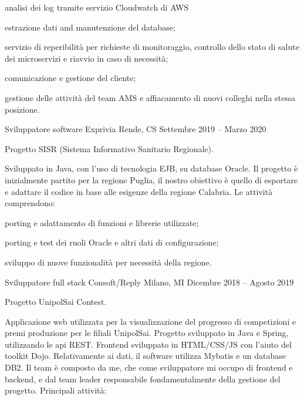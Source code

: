 \documentclass[]{style}
\begin{document}
\begin{cventries}
{\begin{cventryparagraph}
{\begin{cventryparagraphlist}
    		\item {analisi dei log tramite servizio Cloudwatch di AWS}
    		\item {estrazione dati and manutenzione del database;}
    		\item {servizio di reperibilità per richieste di monitoraggio, controllo dello stato di salute dei microservizi e riavvio in caso di necessità;}
    		\item {comunicazione e gestione del cliente;}
    		\item {gestione delle attività del team AMS e affiacamento di nuovi colleghi nella stessa posizione.}
    	\end{cventryparagraphlist}}
	\end{cventryparagraph}}
	\cventry
	{Sviluppatore software}
	{Exprivia}
	{Rende, CS}
	{Settembre 2019 – Marzo 2020}
	{\begin{cventryparagraph}
		\item {Progetto SISR (Sistema Informativo Sanitario Regionale).}
		\item {Sviluppato in Java, con l'uso di tecnologia EJB, su database Oracle. Il progetto è inizialmente partito per la regione Puglia, il nostro obiettivo è quello di esportare e adattare il codice in base alle esigenze della regione Calabria. Le attività comprendono:}
    	{\begin{cventryparagraphlist}
    		\item {porting e adattamento di funzioni e librerie utilizzate;}
    		\item {porting e test dei ruoli Oracle e altri dati di configurazione;}
    		\item {sviluppo di nuove funzionalità per necessità della regione.}
    	\end{cventryparagraphlist}}
	\end{cventryparagraph}}
	\cventry
	{Sviluppatore full stack}
	{Consoft/Reply}
	{Milano, MI}
	{Dicembre 2018 – Agosto 2019}
	{\begin{cventryparagraph}
		\item {Progetto UnipolSai Contest.}
		\item {Applicazione web utilizzata per la visualizzazione del progresso di competizioni e premi produzione per le filiali UnipolSai. Progetto sviluppato in Java e Spring, utilizzando le api REST. Frontend sviluppato in HTML/CSS/JS con l'aiuto del toolkit Dojo. Relativamente ai dati, il software utilizza Mybatis e un database DB2.
		Il team è composto da me, che come sviluppatore mi occupo di frontend e backend, e dal team leader responsabile fondamentalmente della gestione del progetto. Principali attività:}

\end{cventryparagraph}}
\end{cventries}
\end{document}
